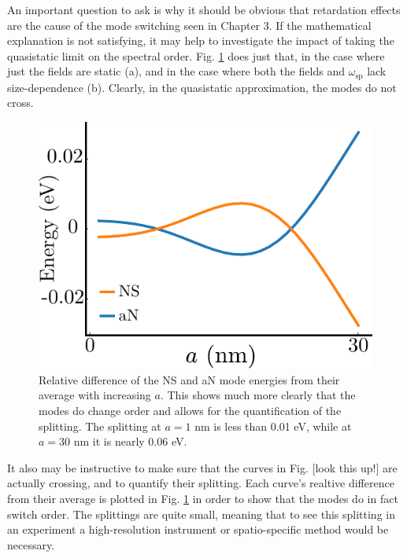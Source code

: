 \documentclass [11pt, proquest] {uwthesis}[2016/11/22]
\begin{document}
An important question to ask is why it should be obvious that retardation effects are the cause of the mode switching seen in Chapter 3. If the mathematical explanation is not satisfying, it may help to investigate the impact of taking the quasistatic limit on the spectral order. Fig. \ref{diff_scale} does just that, in the case where just the fields are static (a), and in the case where both the fields and $\omega_{\textrm{sp}}$ lack size-dependence (b). Clearly, in the quasistatic approximation, the modes do not cross.

\newpage
\begin{figure}
\begin{centering}
\includegraphics{eig_diff_scale.pdf}
\caption{Relative difference of the NS and aN mode energies from their average with increasing $a$. This shows much more clearly that the modes do change order and allows for the quantification of the splitting. The splitting at $a = 1$ nm is less than 0.01 eV, while at $a = 30$ nm it is nearly 0.06 eV.}
\label{diff_scale}
\end{centering}
\end{figure}

It also may be instructive to make sure that the curves in Fig. [look this up!] are actually crossing, and to quantify their splitting. Each curve's realtive difference from their average is plotted in Fig. \ref{diff_scale} in order to show that the modes do in fact switch order. The splittings are quite small, meaning that to see this splitting in an experiment a high-resolution instrument or spatio-specific method would be necessary.
\end{document}

